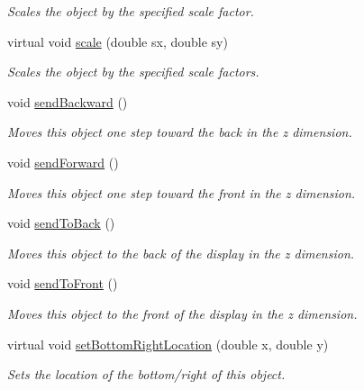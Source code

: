 \begin{DoxyCompactItemize}
\begin{DoxyCompactList}\small\item\em Scales the object by the specified scale factor. \end{DoxyCompactList}\item 
virtual void \mbox{\hyperlink{classsgl_1_1GObject_a63641f69d610d0b951357d35a0c3b1e3}{scale}} (double sx, double sy)
\begin{DoxyCompactList}\small\item\em Scales the object by the specified scale factors. \end{DoxyCompactList}\item 
void \mbox{\hyperlink{classsgl_1_1GObject_ab6747f40313c531c2db32edb5b63b9b7}{send\+Backward}} ()
\begin{DoxyCompactList}\small\item\em Moves this object one step toward the back in the {\itshape z} dimension. \end{DoxyCompactList}\item 
void \mbox{\hyperlink{classsgl_1_1GObject_a710b3e449c9facba7847c91ab170d281}{send\+Forward}} ()
\begin{DoxyCompactList}\small\item\em Moves this object one step toward the front in the {\itshape z} dimension. \end{DoxyCompactList}\item 
void \mbox{\hyperlink{classsgl_1_1GObject_a0f7f1efbb7fd46dde2867c4ad0330896}{send\+To\+Back}} ()
\begin{DoxyCompactList}\small\item\em Moves this object to the back of the display in the {\itshape z} dimension. \end{DoxyCompactList}\item 
void \mbox{\hyperlink{classsgl_1_1GObject_aee33d68488e46827ef55fac07f40a9b2}{send\+To\+Front}} ()
\begin{DoxyCompactList}\small\item\em Moves this object to the front of the display in the {\itshape z} dimension. \end{DoxyCompactList}\item 
virtual void \mbox{\hyperlink{classsgl_1_1GObject_a71ff7b16b8f1bdc4a1ce9f30cf8b87d8}{set\+Bottom\+Right\+Location}} (double x, double y)
\begin{DoxyCompactList}\small\item\em Sets the location of the bottom/right of this object. \end{DoxyCompactList}\item 

\end{DoxyCompactItemize}
